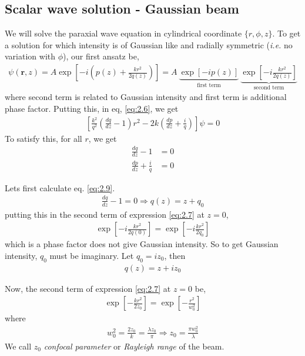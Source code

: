 \documentclass[11pt,a4paper]{article}
\numberwithin{equation}{section}
\begin{document}
\subsection{Scalar wave solution - Gaussian beam}
We will solve the paraxial wave equation in cylindrical coordinate $\{r,\phi,z \}$. \cite{cornell}
To get a solution for which intensity is of Gaussian like and radially symmetric (\textit{i.e.} no variation with $\phi$), our first ansatz be, \cite{kogelnik 66}\cite{cornell}
\begin{align}
	\psi(\boldsymbol{r},z)= A \exp\left[-i\left(p(z) + \frac{kr^2}{2q(z)}\right)\right]
	=A\:\underbrace{\exp\left[-ip(z)\right]}_{\text{first term}} \:\underbrace{\exp\left[-i\frac{kr^2}{2q(z)}\right]} _{\text{second term}} \label{eq:2.7}
\end{align} 
where second term is related to Gaussian intensity and first term is additional phase factor. Putting this, in eq, \ref{eq:2.6}, we get
\begin{align}
	\left[\frac{k^2}{q^2}\left(\frac{dq}{dz}-1\right)r^2 -2k\left(\frac{dp}{dz}+\frac{i}{q}\right)\right]\psi= 0
\end{align}
To satisfy this, for all $r$, we get
\begin{align}
	\frac{dq}{dz}-1 &=0 \label{eq:2.9}\\
	\frac{dp}{dz}+\frac{i}{q} &=0\label{eq:2.10}
\end{align}

Lets first calculate eq. \ref{eq:2.9}.
\begin{align}
	\frac{dq}{dz}-1 =0 
	\Rightarrow q(z) = z + q_0 \label{eq:2.11}
\end{align}
putting this in the second term of expression \ref{eq:2.7} at $z=0$,
\begin{align}
	\exp\left[-i\frac{kr^2}{2q(0)}\right] = \exp\left[-i\frac{kr^2}{2q_0}\right]
\end{align}
which is a phase factor does not give Gaussian intensity. So to get Gaussian intensity, $q_0$ must be imaginary. Let $q_0=iz_0$, then 
\begin{align}
	\boxed{q(z) = z + iz_0} \label{eq:2.13}
\end{align}

Now, the second term of expression \ref{eq:2.7} at $z=0$ be,
\begin{align}
	\exp\left[-\frac{kr^2}{2z_0}\right] = \exp\left[-\frac{r^2}{w_0^2}\right]
\end{align}
where
\begin{align}
	w_0^2=\frac{2z_0}{k}=\frac{\lambda z_0}{\pi}
	\Rightarrow \boxed{z_0 = \frac{\pi w_0^2}{\lambda} }
\end{align}
We call $z_0$ \textit{confocal parameter} or \textit{Rayleigh range} of the beam.
\end{document}
